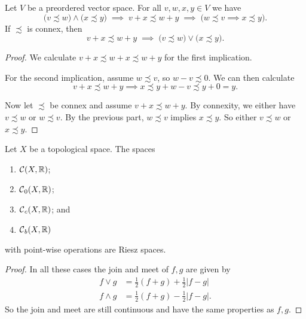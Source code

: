 \begin{lemma} \label{additionVectorInequalities}
Let $V$ be a preordered vector space. For all $v,w, x, y \in V$ we have
\[ \big(v \precsim w\big) \land \big(x \precsim y\big) \;\implies\; v+ x \precsim w+y \;\implies\; \Big( w \precsim v \implies x\precsim y\Big). \]
If $\precsim$ is connex, then
\[ v+ x \precsim w+y \;\implies\; \big(v\precsim w\big)\lor\big( x\precsim y\big). \]
\end{lemma}
\begin{proof}
We calculate $v + x \precsim w + x \precsim w+y$ for the first implication.

For the second implication, assume $w\precsim v$, so $w-v \precsim 0$. We can then calculate
\[ v+ x \precsim w+y \implies x\precsim y + w - v \precsim y + 0 = y. \]

Now let $\precsim$ be connex and assume $v+ x \precsim w+y$. By connexity, we either have $v\precsim w$ or $w\precsim v$. By the previous part, $w\precsim v$ implies $x\precsim y$. So either $v\precsim w$ or $x\precsim y$.
\end{proof}

\begin{lemma}
Let $X$ be a topological space. The spaces
\begin{enumerate}
\item $\operatorname{\mathcal{C}}(X,\mathbb{R})$;
\item $\operatorname{\mathcal{C}}_0(X,\mathbb{R})$;
\item $\operatorname{\mathcal{C}}_c(X,\mathbb{R})$; and
\item $\operatorname{\mathcal{C}}_b(X,\mathbb{R})$
\end{enumerate}
with point-wise operations are Riesz spaces.
\end{lemma}
\begin{proof}
In all these cases the join and meet of $f,g$ are given by
\begin{align*}
f \vee g &= \frac{1}{2}(f+g)+ \frac{1}{2}|f-g| \\
f \wedge g &= \frac{1}{2}(f+g) - \frac{1}{2}|f-g|.
\end{align*}
So the join and meet are still continuous and have the same properties as $f,g$.
\end{proof}

